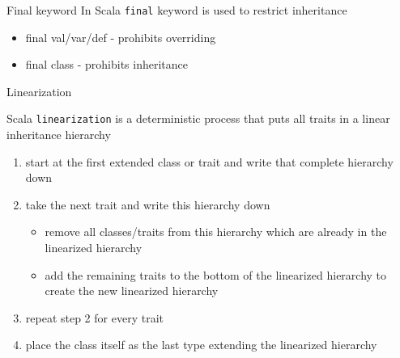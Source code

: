 \documentclass[aspectratio=169]{beamer}
\begin{document}
\begin{frame}{Final keyword}
  In Scala \texttt{final} keyword is used to restrict inheritance
  \begin{itemize}
    \item final val/var/def - prohibits overriding
    \item final class - prohibits inheritance
  \end{itemize}
\end{frame}

\begin{frame}{Linearization}
\begin{block}{}
  Scala \texttt{linearization}\cite{spec-lin} is a deterministic process that puts all traits in a linear inheritance
  hierarchy
\end{block}
\pause
\begin{enumerate}
  \item start at the first extended class or trait and write that complete hierarchy down
  \item take the next trait and write this hierarchy down
    \begin{itemize}
      \item  remove all classes/traits from this hierarchy which are already in the linearized
        hierarchy
      \item add the remaining traits to the bottom of the linearized hierarchy to create the new
        linearized hierarchy
    \end{itemize}
    \item repeat step 2 for every trait
    \item place the class itself as the last type extending the linearized hierarchy
\end{enumerate}
\end{frame}
\end{document}

